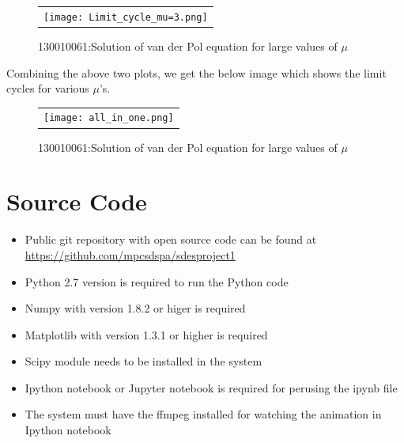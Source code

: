 \documentclass[12pt, a4paper]{report}
\begin{document}
\begin{figure}[H]
	\centering
	\begin{tabular} {l}
	\texttt{[image: Limit\_cycle\_mu=3.png]} 
	\end{tabular}
	\caption{130010061:Solution of van der Pol equation for large values of $\mu$}
\end{figure}
\label{fig7}

Combining the above two plots, we get the below image which shows the limit cycles for various  $\mu$'s.\cite{belur}
\begin{figure}[H]
	\centering
	\begin{tabular} {l}
	\texttt{[image: all\_in\_one.png]} 
	\end{tabular}
	\caption{130010061:Solution of van der Pol equation for large values of $\mu$}
\end{figure}
\label{fig8}

\chapter{Source Code}
\begin{itemize}
\item Public git repository with open source code can be found at \url{https://github.com/mpcsdspa/sdesproject1}
\item Python 2.7 version is required to run the Python code
\item Numpy with version 1.8.2 or higer is required
\item Matplotlib with version 1.3.1 or higher is required
\item Scipy module needs to be installed in the system
\item Ipython notebook or Jupyter notebook is required for perusing the ipynb file
\item The system must have the ffmpeg installed for watching the animation in Ipython notebook
\end{itemize}

%


\end{document}
